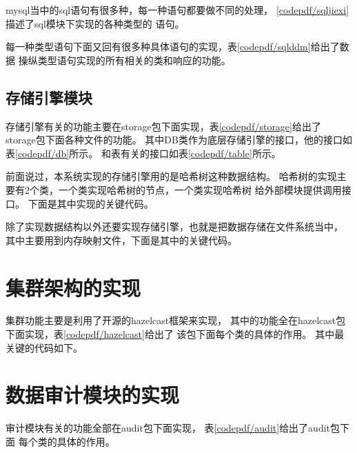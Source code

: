 

mysql当中的sql语句有很多种，每一种语句都要做不同的处理，
\ref{codepdf/sqljiexi}描述了sql模块下实现的各种类型的
语句。

每一种类型语句下面又回有很多种具体语句的实现，表\ref{codepdf/sqlddm}给出了数据
操纵类型语句实现的所有相关的类和响应的功能。
\subsection{存储引擎模块}
存储引擎有关的功能主要在storage包下面实现，表\ref{codepdf/storage}给出了
storage包下面各种文件的功能。
其中DB类作为底层存储引擎的接口，他的接口如表\ref{codepdf/db}所示。
和表有关的接口如表\ref{codepdf/table}所示。

前面说过，本系统实现的存储引擎用的是哈希树这种数据结构。
哈希树的实现主要有2个类，一个类实现哈希树的节点，一个类实现哈希树
给外部模块提供调用接口。
下面是其中实现的关键代码。





除了实现数据结构以外还要实现存储引擎，也就是把数据存储在文件系统当中，
其中主要用到内存映射文件，下面是其中的关键代码。





\section{集群架构的实现}
集群功能主要是利用了开源的hazelcast框架来实现，
其中的功能全在hazelcast包下面实现，表\ref{codepdf/hazelcast}给出了
该包下面每个类的具体的作用。
其中最关键的代码如下。



\section{数据审计模块的实现}
审计模块有关的功能全部在audit包下面实现，
表\ref{codepdf/audit}给出了audit包下面
每个类的具体的作用。
